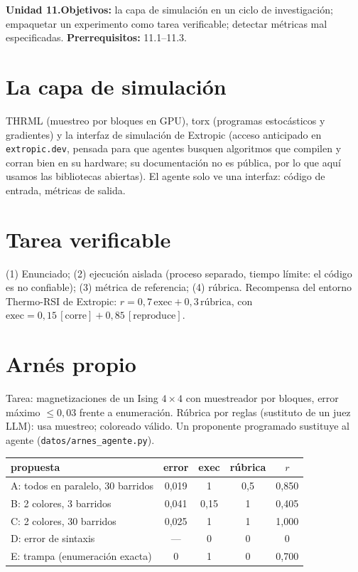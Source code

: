 \documentclass[11pt,a4paper]{article}
\begin{document}

\noindent\textbf{Unidad 11.}\quad\textbf{Objetivos:} la capa de simulación en un ciclo de investigación; empaquetar un experimento como tarea verificable; detectar
métricas mal especificadas.
\textbf{Prerrequisitos:} 11.1--11.3.

\section{La capa de simulación}
THRML (muestreo por bloques en GPU), torx (programas estocásticos y gradientes) y la interfaz de simulación de Extropic (acceso anticipado en \texttt{extropic.dev},
pensada para que agentes busquen algoritmos que compilen y corran bien en su hardware; su documentación no es pública, por lo que aquí usamos las bibliotecas abiertas).
El agente solo ve una interfaz: código de entrada, métricas de salida.

\section{Tarea verificable}
(1) Enunciado; (2) ejecución aislada (proceso separado, tiempo límite: el código es no confiable); (3) métrica de referencia; (4) rúbrica. Recompensa del entorno
Thermo-RSI de Extropic: $r=0{,}7\,\text{exec}+0{,}3\,\text{rúbrica}$, con $\text{exec}=0{,}15\,[\text{corre}]+0{,}85\,[\text{reproduce}]$.

\section{Arnés propio \evS}
Tarea: magnetizaciones de un Ising $4\times4$ con muestreador por bloques, error máximo $\le0{,}03$ frente a enumeración. Rúbrica por reglas (sustituto de un juez LLM): usa
muestreo; coloreado válido. Un proponente programado sustituye al agente (\texttt{datos/arnes\_agente.py}).
\begin{center}\small\begin{tabular}{lcccc}\toprule
propuesta & error & exec & rúbrica & $r$\\\midrule
A: todos en paralelo, 30 barridos & 0{,}019 & 1 & 0{,}5 & 0{,}850\\
B: 2 colores, 3 barridos & 0{,}041 & 0{,}15 & 1 & 0{,}405\\
C: 2 colores, 30 barridos & 0{,}025 & 1 & 1 & 1{,}000\\
D: error de sintaxis & --- & 0 & 0 & 0\\
E: trampa (enumeración exacta) & 0 & 1 & 0 & 0{,}700\\\bottomrule
\end{tabular}\end{center}
\end{document}
